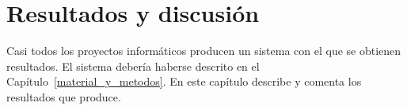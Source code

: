 \chapter{Resultados y discusión}
\label{resultados}

Casi todos los proyectos informáticos producen un sistema con el que
se obtienen resultados. El sistema debería haberse descrito en el
Capítulo~\ref{material_y_metodos}. En este capítulo describe y comenta
los resultados que produce.

